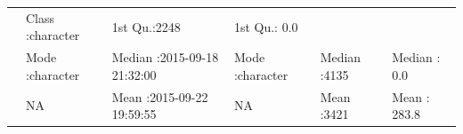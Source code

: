 \documentclass[]{article}
\begin{document}
\begin{longtable}[]{@{}llllll@{}}
\begin{minipage}[t]{0.24\columnwidth}
\end{minipage} & \begin{minipage}[t]{0.15\columnwidth}\raggedright\strut
Class :character\strut
\end{minipage} & \begin{minipage}[t]{0.12\columnwidth}\raggedright\strut
1st Qu.:2248\strut
\end{minipage} & \begin{minipage}[t]{0.14\columnwidth}\raggedright\strut
1st Qu.: 0.0\strut
\end{minipage}\tabularnewline
\begin{minipage}[t]{0.03\columnwidth}\raggedright\strut
\strut
\end{minipage} & \begin{minipage}[t]{0.15\columnwidth}\raggedright\strut
Mode :character\strut
\end{minipage} & \begin{minipage}[t]{0.24\columnwidth}\raggedright\strut
Median :2015-09-18 21:32:00\strut
\end{minipage} & \begin{minipage}[t]{0.15\columnwidth}\raggedright\strut
Mode :character\strut
\end{minipage} & \begin{minipage}[t]{0.12\columnwidth}\raggedright\strut
Median :4135\strut
\end{minipage} & \begin{minipage}[t]{0.14\columnwidth}\raggedright\strut
Median : 0.0\strut
\end{minipage}\tabularnewline
\begin{minipage}[t]{0.03\columnwidth}\raggedright\strut
\strut
\end{minipage} & \begin{minipage}[t]{0.15\columnwidth}\raggedright\strut
NA\strut
\end{minipage} & \begin{minipage}[t]{0.24\columnwidth}\raggedright\strut
Mean :2015-09-22 19:59:55\strut
\end{minipage} & \begin{minipage}[t]{0.15\columnwidth}\raggedright\strut
NA\strut
\end{minipage} & \begin{minipage}[t]{0.12\columnwidth}\raggedright\strut
Mean :3421\strut
\end{minipage} & \begin{minipage}[t]{0.14\columnwidth}\raggedright\strut
Mean : 283.8\strut
\end{minipage}\tabularnewline

\end{longtable}
\end{document}

